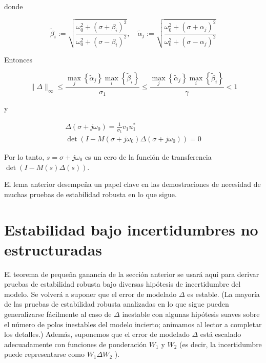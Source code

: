 donde

$$
\tilde{\beta}_{i}:=\sqrt{\frac{\omega_{0}^{2}+\left(\sigma+\beta_{i}\right)^{2}}{\omega_{0}^{2}+\left(\sigma-\beta_{i}\right)^{2}}}, \quad \tilde{\alpha}_{j}:=\sqrt{\frac{\omega_{0}^{2}+\left(\sigma+\alpha_{j}\right)^{2}}{\omega_{0}^{2}+\left(\sigma-\alpha_{j}\right)^{2}}}
$$

Entonces

$$
\|\Delta\|_{\infty} \leq \frac{\max _{j}\left\{\tilde{\alpha}_{j}\right\} \max _{i}\left\{\tilde{\beta}_{i}\right\}}{\sigma_{1}} \leq \frac{\max _{j}\left\{\tilde{\alpha}_{j}\right\} \max _{i}\left\{\tilde{\beta}_{i}\right\}}{\gamma}<1
$$

y

$$
\begin{gathered}
\Delta\left(\sigma+j \omega_{0}\right)=\frac{1}{\sigma_{1}} v_{1} u_{1}^{*} \\
\operatorname{det}\left(I-M\left(\sigma+j \omega_{0}\right) \Delta\left(\sigma+j \omega_{0}\right)\right)=0
\end{gathered}
$$

Por lo tanto, $s=\sigma+j \omega_{0}$ es un cero de la función de transferencia $\operatorname{det}(I-M(s) \Delta(s))$.

El lema anterior desempeña un papel clave en las demostraciones de necesidad de muchas pruebas de estabilidad robusta en lo que sigue.

\section{Estabilidad bajo incertidumbres no estructuradas}
El teorema de pequeña ganancia de la sección anterior se usará aquí para derivar pruebas de estabilidad robusta bajo diversas hipótesis de incertidumbre del modelo. Se volverá a suponer que el error de modelado $\Delta$ es estable. (La mayoría de las pruebas de estabilidad robusta analizadas en lo que sigue pueden generalizarse fácilmente al caso de $\Delta$ inestable con algunas hipótesis suaves sobre el número de polos inestables del modelo incierto; animamos al lector a completar los detalles.) Además, suponemos que el error de modelado $\Delta$ está escalado adecuadamente con funciones de ponderación $W_{1}$ y $W_{2}$ (es decir, la incertidumbre puede representarse como $W_{1} \Delta W_{2}$ ).


